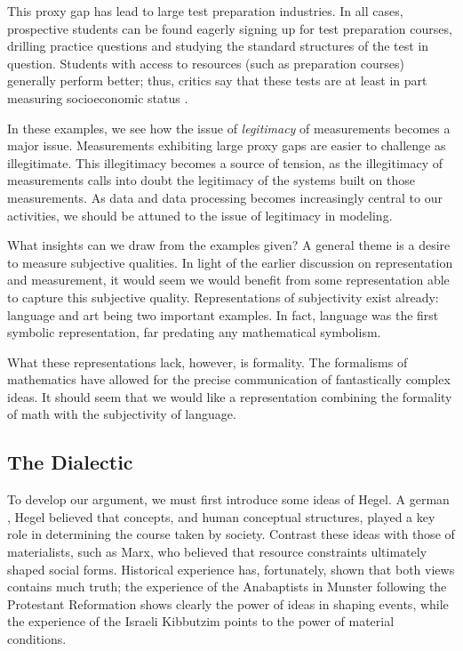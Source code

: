 This proxy gap has lead to large test preparation industries.
In all cases, prospective students can be found eagerly signing up for test preparation courses, drilling practice questions and studying the standard structures of the test in question.
Students with access to resources (such as preparation courses) generally perform better; thus, critics say that these tests are at least in part measuring socioeconomic status \citep{zumbrin}.

\bigskip

In these examples, we see how the issue of \textit{legitimacy} of measurements becomes a major issue.
Measurements exhibiting large proxy gaps are easier to challenge as illegitimate.
This illegitimacy becomes a source of tension, as the illegitimacy of measurements calls into doubt the legitimacy of the systems built on those measurements.
As data and data processing becomes increasingly central to our activities, we should be attuned to the issue of legitimacy in modeling.

What insights can we draw from the examples given?
A general theme is a desire to measure subjective qualities.
In light of the earlier discussion on representation and measurement, it would seem we would benefit from some representation able to capture this subjective quality.
Representations of subjectivity exist already: language and art being two important examples.
In fact, language was the first symbolic representation, far predating any mathematical symbolism.

What these representations lack, however, is formality.
The formalisms of mathematics have allowed for the precise communication of fantastically complex ideas.
It should seem that we would like a representation combining the formality of math with the subjectivity of language.

\subsection{The Dialectic}

To develop our argument, we must first introduce some ideas of Hegel.
A german , Hegel believed that concepts, and human conceptual structures, played a key role in determining the course taken by society.
Contrast these ideas with those of materialists, such as Marx, who believed that resource constraints ultimately shaped social forms.
Historical experience has, fortunately, shown that both views contains much truth; the experience of the Anabaptists in Munster following the Protestant Reformation \citep{carlin} shows clearly the power of ideas in shaping events, while the experience of the Israeli Kibbutzim points to the power of material conditions.

